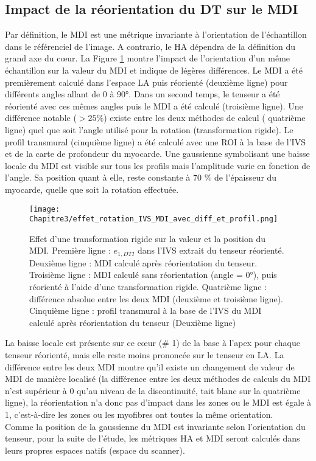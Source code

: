 \subsection{Impact de la réorientation du DT sur le MDI}

Par définition, le MDI est une métrique invariante à l’orientation de l’échantillon dans le référenciel de l’image. A contrario, le HA dépendra de la définition du grand axe du cœur.  La Figure \ref{fig:reo_MDI} montre l’impact de l’orientation d’un même échantillon sur la valeur du MDI et indique de légères différences.  Le MDI a été premièrement calculé dans l’espace LA puis réorienté (deuxième ligne) pour différents angles allant de 0 à 90°. Dans un second temps, le tenseur a été réorienté avec ces mêmes angles puis le MDI a été calculé (troisième ligne).  Une différence notable ($>25 \%$)  existe entre les deux méthodes de calcul ( quatrième ligne) quel que soit l’angle utilisé pour la rotation (transformation rigide). Le profil transmural (cinquième ligne) a été calculé avec une ROI à la base de l’IVS et de la carte de profondeur du myocarde. Une gaussienne symbolisant une baisse locale du MDI est visible sur tous les profils mais l’amplitude varie en fonction de l’angle. Sa position quant à elle, reste constante à 70 \% de l’épaisseur du myocarde, quelle que soit la rotation effectuée. 

\begin{figure}[!ht]
  \begin{center}
    \texttt{[image: Chapitre3/effet\_rotation\_IVS\_MDI\_avec\_diff\_et\_profil.png]}
  \end{center}
  \caption{Effet d’une transformation rigide sur la valeur et la position du MDI. Première ligne : $e_{1,DTI}$ dans l’IVS extrait du tenseur réorienté. Deuxième ligne : MDI calculé après réorientation du tenseur. Troisième ligne : MDI calculé sans réorientation (angle = 0°), puis réorienté à l’aide d’une transformation rigide. Quatrième ligne : différence absolue entre les deux MDI (deuxième et troisième ligne). Cinquième ligne : profil transmural à la base de l’IVS du MDI calculé après réorientation du tenseur (Deuxième ligne)}
  \label{fig:reo_MDI}
\end{figure}

La baisse locale est présente sur ce cœur (\# 1) de la base à l’apex pour chaque tenseur réorienté, mais elle reste moins prononcée sur le tenseur en LA. La différence entre les deux MDI montre qu’il existe un changement de valeur de MDI de manière localisé (la différence entre les deux méthodes de calculs du MDI n'est supérieur à 0 qu'au niveau de la discontinuité, tait blanc sur la quatrième ligne), la réorientation n’a donc pas d’impact dans les zones ou le MDI est égale à 1, c’est-à-dire les zones ou les myofibres ont toutes la même orientation. 
\\
Comme la position de la gaussienne du MDI est invariante selon l’orientation du tenseur, pour la suite de l’étude, les métriques HA et MDI seront calculés dans leurs propres espaces natifs (espace du scanner).
\clearpage

